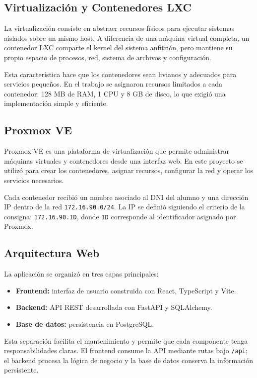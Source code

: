 \documentclass[twoside, 11pt, a4paper]{article}
\begin{document}
    \subsection{Virtualización y Contenedores LXC}

    La virtualización consiste en abstraer recursos físicos para ejecutar sistemas aislados sobre un mismo host. A diferencia de una máquina virtual completa, un contenedor LXC comparte el kernel del sistema anfitrión, pero mantiene su propio espacio de procesos, red, sistema de archivos y configuración.

    Esta característica hace que los contenedores sean livianos y adecuados para servicios pequeños. En el trabajo se asignaron recursos limitados a cada contenedor: 128 MB de RAM, 1 CPU y 8 GB de disco, lo que exigió una implementación simple y eficiente.

    \subsection{Proxmox VE}

    Proxmox VE es una plataforma de virtualización que permite administrar máquinas virtuales y contenedores desde una interfaz web. En este proyecto se utilizó para crear los contenedores, asignar recursos, configurar la red y operar los servicios necesarios.

    Cada contenedor recibió un nombre asociado al DNI del alumno y una dirección IP dentro de la red \texttt{172.16.90.0/24}. La IP se definió siguiendo el criterio de la consigna: \texttt{172.16.90.ID}, donde \texttt{ID} corresponde al identificador asignado por Proxmox.

    \subsection{Arquitectura Web}

    La aplicación se organizó en tres capas principales:

    \begin{itemize}
        \item \textbf{Frontend:} interfaz de usuario construida con React, TypeScript y Vite.
        \item \textbf{Backend:} API REST desarrollada con FastAPI y SQLAlchemy.
        \item \textbf{Base de datos:} persistencia en PostgreSQL.
    \end{itemize}

    Esta separación facilita el mantenimiento y permite que cada componente tenga responsabilidades claras. El frontend consume la API mediante rutas bajo \texttt{/api}; el backend procesa la lógica de negocio y la base de datos conserva la información persistente.
\end{document}
